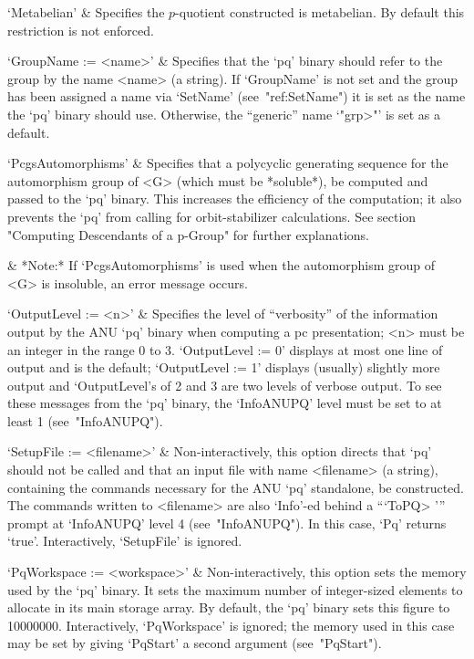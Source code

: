 `Metabelian' &
Specifies the $p$-quotient constructed is  metabelian.  By  default  this
restriction is not enforced.

`GroupName := <name>' &
Specifies that the `pq' binary should refer to  the  group  by  the  name
<name> (a string). If `GroupName' is not  set  and  the  group  has  been
assigned a name via `SetName' (see~"ref:SetName") it is set as  the  name
the `pq' binary should use. Otherwise, the ``generic'' name `"\<grp>"' is
set as a default.

`PcgsAutomorphisms' &
Specifies that a polycyclic  generating  sequence  for  the  automorphism
group of <G> (which must be *soluble*), be computed  and  passed  to  the
`pq' binary. This increases the efficiency of the  computation;  it  also
prevents the `pq' from calling {\GAP} for orbit-stabilizer  calculations.
See  section  "Computing  Descendants   of   a   p-Group"   for   further
explanations.

&
*Note:*
If `PcgsAutomorphisms' is used when the  automorphism  group  of  <G>  is
insoluble, an error message occurs.

`OutputLevel := <n>' &
Specifies the level of ``verbosity'' of the information output by the ANU
`pq' binary when computing a pc presentation; <n> must be an  integer  in
the range 0 to 3. `OutputLevel := 0' displays at most one line of  output
and is the default; `OutputLevel := 1' displays (usually)  slightly  more
output and `OutputLevel's of 2 and 3 are two levels of verbose output. To
see these messages from the `pq' binary, the `InfoANUPQ'  level  must  be
set to at least 1 (see~"InfoANUPQ").

`SetupFile := <filename>' &
Non-interactively, this option directs that `pq' should not be called and
that an input file  with  name  <filename>  (a  string),  containing  the
commands necessary for the  ANU  `pq'  standalone,  be  constructed.  The
commands written to <filename> are also `Info'-ed behind  a  ```ToPQ> '''
prompt at `InfoANUPQ' level  4  (see~"InfoANUPQ").  In  this  case,  `Pq'
returns `true'. Interactively, `SetupFile' is ignored.

`PqWorkspace := <workspace>' &
Non-interactively, this option sets the memory used by the  `pq'  binary.
It sets the maximum number of integer-sized elements to allocate  in  its
main storage array. By default, the  `pq'  binary  sets  this  figure  to
10000000. Interactively, `PqWorkspace' is ignored;  the  memory  used  in
this  case  may  be  set  by   giving   `PqStart'   a   second   argument
(see~"PqStart").

